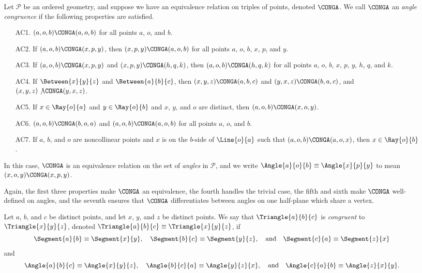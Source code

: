 \documentclass{article}
\begin{document}
\begin{dfn}
Let $\mathcal{P}$ be an ordered geometry, and suppose we have an equivalence relation on triples of points, denoted $\CONGA$. We call $\CONGA$ an \emph{angle congruence} if the following properties are satisfied.
\begin{itemize}
\item[AC1.] $(a,o,b) \CONGA (a,o,b)$ for all points $a$, $o$, and $b$.
\item[AC2.] If $(a,o,b) \CONGA (x,p,y)$, then $(x,p,y) \CONGA (a,o,b)$ for all points $a$, $o$, $b$, $x$, $p$, and $y$.
\item[AC3.] If $(a,o,b) \CONGA (x,p,y)$ and $(x,p,y) \CONGA (h,q,k)$, then $(a,o,b) \CONGA (h,q,k)$ for all points $a$, $o$, $b$, $x$, $p$, $y$, $h$, $q$, and $k$.
\item[AC4.] If $\Between{x}{y}{z}$ and $\Between{a}{b}{c}$, then $(x,y,z) \CONGA (a,b,c)$ and $(y,x,z) \CONGA (b,a,c)$, and $(x,y,z) \not\CONGA (y,x,z)$.
\item[AC5.] If $x \in \Ray{o}{a}$ and $y \in \Ray{o}{b}$ and $x$, $y$, and $o$ are distinct, then $(a,o,b) \CONGA (x,o,y)$.
\item[AC6.] $(a,o,b) \CONGA (b,o,a)$ and $(a,o,b) \CONGA (a,o,b)$ for all points $a$, $o$, and $b$.
\item[AC7.] If $a$, $b$, and $o$ are noncollinear points and $x$ is on the $b$-side of $\Line{o}{a}$ such that $(a,o,b) \CONGA (a,o,x)$, then $x \in \Ray{o}{b}$.
\end{itemize}

In this case, $\CONGA$ is an equivalence relation on the set of \emph{angles} in $\mathcal{P}$, and we write $\Angle{a}{o}{b} \equiv \Angle{x}{p}{y}$ to mean $(x,o,y) \CONGA (x,p,y)$.
\end{dfn}

Again, the first three properties make $\CONGA$ an equivalence, the fourth handles the trivial case, the fifth and sixth make $\CONGA$ well-defined on angles, and the seventh ensures that $\CONGA$ differentiates between angles on one half-plane which share a vertex.

\begin{dfn}
Let $a$, $b$, and $c$ be distinct points, and let $x$, $y$, and $z$ be distinct points. We say that $\Triangle{a}{b}{c}$ is \emph{congruent} to $\Triangle{x}{y}{z}$, denoted $\Triangle{a}{b}{c} \equiv \Triangle{x}{y}{z}$, if \[ \Segment{a}{b} \equiv \Segment{x}{y}, \quad \Segment{b}{c} \equiv \Segment{y}{z}, \quad \mathrm{and} \quad \Segment{c}{a} \equiv \Segment{z}{x} \] and \[ \Angle{a}{b}{c} \equiv \Angle{x}{y}{z}, \quad \Angle{b}{c}{a} \equiv \Angle{y}{z}{x}, \quad \mathrm{and} \quad \Angle{c}{a}{b} \equiv \Angle{z}{x}{y}. \]
\end{dfn}
\end{document}
